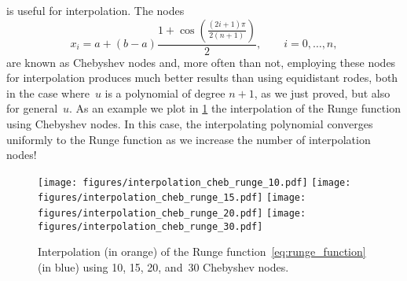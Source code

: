  is useful for interpolation.
The nodes
\begin{equation}
    x_i = a + (b-a) \frac{1 + \cos \left( \frac{(2i + 1)\pi}{2 (n+1)} \right)}{2}, \qquad i = 0, \dotsc, n,
\end{equation}
are known as Chebyshev nodes and,
more often than not, employing these nodes for interpolation produces much better results than using equidistant rodes,
both in the case where~$u$ is a polynomial of degree $n+1$,
as we just proved,
but also for general~$u$.
As an example we plot in \cref{fig:cheb_runge} the interpolation of the Runge function using Chebyshev nodes.
In this case, the interpolating polynomial converges uniformly to the Runge function as we increase the number of interpolation nodes!
\begin{figure}[ht]
    \centering
    \texttt{[image: figures/interpolation\_cheb\_runge\_10.pdf]}
    \texttt{[image: figures/interpolation\_cheb\_runge\_15.pdf]}
    \texttt{[image: figures/interpolation\_cheb\_runge\_20.pdf]}
    \texttt{[image: figures/interpolation\_cheb\_runge\_30.pdf]}
    \caption{Interpolation (in orange) of the Runge function~\eqref{eq:runge_function} (in blue) using 10, 15, 20, and~30 Chebyshev nodes.}%
    \label{fig:cheb_runge}
\end{figure}

